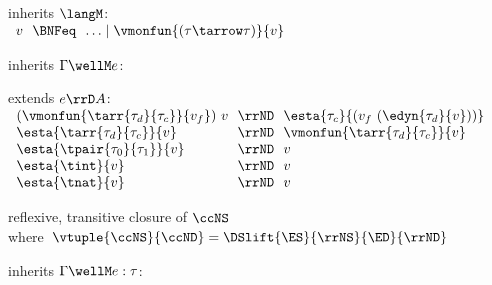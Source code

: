 \begin{flushleft}

\begin{minipage}[t]{\columnwidth}
 inherits $\langM$:\\
$\begin{array}{l@{~~}c@{~~}l}
  v & \BNFeq & \ldots \mid \vmonfun{(\tau\tarrow\tau)}{v}
\end{array}$

\smallskip
{} inherits $\Gamma \wellM e$:\\[-1.4ex]
\begin{mathpar}
\end{mathpar}

\smallskip
{} extends $e \rrD A$:\\
$\begin{array}{l@{~~}c@{~~}l}
  (\vmonfun{\tarr{\tau_d}{\tau_c}}{v_f})~v & \rrND & \esta{\tau_c}{(v_f~(\edyn{\tau_d}{v}))}
\\
  \esta{\tarr{\tau_d}{\tau_c}}{v} & \rrND & \vmonfun{\tarr{\tau_d}{\tau_c}}{v}
\\
  \esta{\tpair{\tau_0}{\tau_1}}{v} & \rrND & v
\\
  \esta{\tint}{v} & \rrND & v
\\
  \esta{\tnat}{v} & \rrND & v
\end{array}$

\smallskip
{} reflexive, transitive closure of $\ccNS$\\
\mbox{\quad where $\vtuple{\ccNS}{\ccND} = \DSlift{\ES}{\rrNS}{\ED}{\rrND}$}
\smallskip
\end{minipage}\hspace{\columnsep}%
\begin{minipage}[t]{\columnwidth}
 inherits $\Gamma \wellM e : \tau$:\\[-1.4ex]
\begin{mathpar}
\end{mathpar}


\end{minipage}
\end{flushleft}
